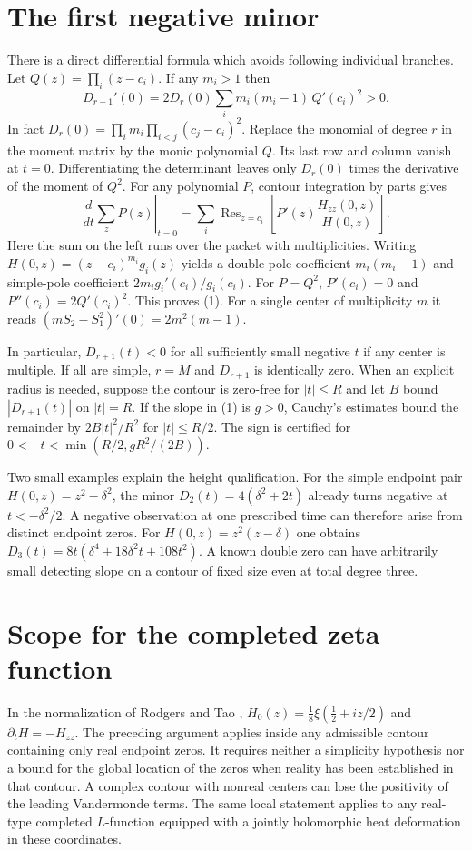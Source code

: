 \documentclass[11pt]{article}
\begin{document}
\section{The first negative minor}
There is a direct differential formula which avoids following individual branches. Let $Q(z)=\prod_i(z-c_i)$. If any $m_i>1$ then
\[
 D_{r+1}'(0)= 2D_r(0)\sum_i m_i(m_i-1)\,Q'(c_i)^2>0.
 \tag{1}
\]
In fact $D_r(0)=\prod_i m_i\prod_{i<j}(c_j-c_i)^2$. Replace the monomial of degree $r$ in the moment matrix by the monic polynomial $Q$. Its last row and column vanish at $t=0$. Differentiating the determinant leaves only $D_r(0)$ times the derivative of the moment of $Q^2$. For any polynomial $P$, contour integration by parts gives
\[
 \left.\frac{d}{dt}\sum_z P(z)\right|_{t=0}
   =\sum_i\operatorname{Res}_{z=c_i}
     \left[P'(z)\frac{H_{zz}(0,z)}{H(0,z)}\right].
\]
Here the sum on the left runs over the packet with multiplicities. Writing $H(0,z)=(z-c_i)^{m_i}g_i(z)$ yields a double-pole coefficient $m_i(m_i-1)$ and simple-pole coefficient $2m_i g_i'(c_i)/g_i(c_i)$. For $P=Q^2$, $P'(c_i)=0$ and $P''(c_i)=2Q'(c_i)^2$. This proves (1). For a single center of multiplicity $m$ it reads $(m S_2-S_1^2)'(0)=2m^2(m-1)$.

In particular, $D_{r+1}(t)<0$ for all sufficiently small negative $t$ if any center is multiple. If all are simple, $r=M$ and $D_{r+1}$ is identically zero. When an explicit radius is needed, suppose the contour is zero-free for $|t|\le R$ and let $B$ bound $|D_{r+1}(t)|$ on $|t|=R$. If the slope in (1) is $g>0$, Cauchy's estimates bound the remainder by $2B|t|^2/R^2$ for $|t|\le R/2$. The sign is certified for $0<-t<\min(R/2,gR^2/(2B))$.

Two small examples explain the height qualification. For the simple endpoint pair $H(0,z)=z^2-\delta^2$, the minor $D_2(t)=4(\delta^2+2t)$ already turns negative at $t<-\delta^2/2$. A negative observation at one prescribed time can therefore arise from distinct endpoint zeros. For $H(0,z)=z^2(z-\delta)$ one obtains $D_3(t)=8t(\delta^4+18\delta^2t+108t^2)$. A known double zero can have arbitrarily small detecting slope on a contour of fixed size even at total degree three.

\section{Scope for the completed zeta function}
In the normalization of Rodgers and Tao \cite{rt},
$H_0(z)=\tfrac18\xi(\tfrac12+iz/2)$ and $\partial_t H=-H_{zz}$. The preceding argument applies inside any admissible contour containing only real endpoint zeros. It requires neither a simplicity hypothesis nor a bound for the global location of the zeros when reality has been established in that contour. A complex contour with nonreal centers can lose the positivity of the leading Vandermonde terms. The same local statement applies to any real-type completed $L$-function equipped with a jointly holomorphic heat deformation in these coordinates.
\end{document}
